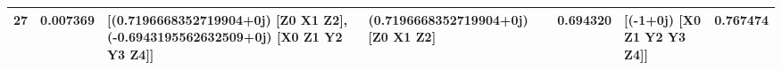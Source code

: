 \begin{tabular}{rrllrlr}
      27 &      0.007369 &                                                                                                                                                                                                                                                                                 [(0.7196668352719904+0j) [Z0 X1 Z2], (-0.6943195562632509+0j) [X0 Z1 Y2 Y3 Z4]] &           (0.7196668352719904+0j) [Z0 X1 Z2] &      0.694320 &                                                                                                                                                                                                                                                                                                 [(-1+0j) [X0 Z1 Y2 Y3 Z4]] &  0.767474 \\
\bottomrule
\end{tabular}
